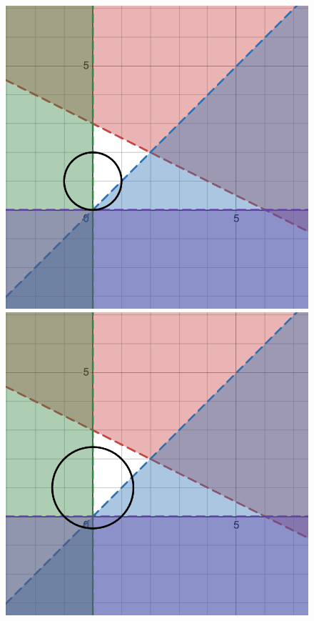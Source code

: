 \documentclass[11pt]{article}
\begin{document}
\begin{enumerate}[leftmargin=*, itemsep=1.5em]
\begin{figure}[H]
    \centering
    \begin{minipage}[t]{0.48\textwidth}
        \centering
        \includegraphics[width=\textwidth]{figures/HW1_a-1.png}
    \end{minipage}
    \hfill
    \begin{minipage}[t]{0.48\textwidth}
        \centering
        \includegraphics[width=\textwidth]{figures/HW1_a-2.png}
    \end{minipage}
    

\end{figure}
\end{enumerate}
\end{document}
